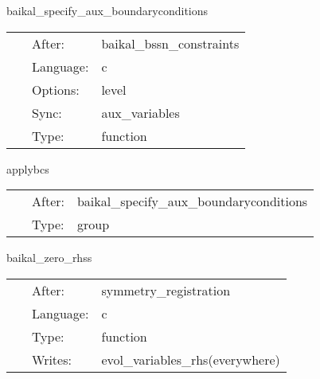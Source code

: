 \hspace{5mm} baikal\_specify\_aux\_boundaryconditions 

\hspace{5mm}{\it register boundary conditions and perform amr+interprocessor synchronization } 


\hspace{5mm}

 \begin{tabular*}{160mm}{cll} 
~ & After:  & baikal\_bssn\_constraints \\ 
~ & Language:  & c \\ 
~ & Options:  & level \\ 
~ & Sync:  & aux\_variables \\ 
~ & Type:  & function \\ 
\end{tabular*} 


\vspace{5mm}


\hspace{5mm} applybcs 

\hspace{5mm}{\it apply registered boundary conditions } 


\hspace{5mm}

 \begin{tabular*}{160mm}{cll} 
~ & After:  & baikal\_specify\_aux\_boundaryconditions \\ 
~ & Type:  & group \\ 
\end{tabular*} 


\vspace{5mm}


\hspace{5mm} baikal\_zero\_rhss 

\hspace{5mm}{\it idea from lean: set all rhs functions to zero to prevent spurious nans } 


\hspace{5mm}

 \begin{tabular*}{160mm}{cll} 
~ & After:  & symmetry\_registration \\ 
~ & Language:  & c \\ 
~ & Type:  & function \\ 
~ & Writes:  & evol\_variables\_rhs(everywhere) \\ 
\end{tabular*} 


